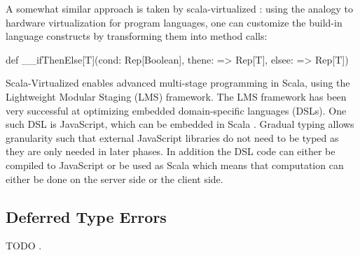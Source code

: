 A somewhat similar approach is taken by scala-virtualized \cite{scala-virtualized}: using the analogy to hardware virtualization for program languages, one can customize the build-in language constructs by transforming them into method calls:

\begin{lstlisting-nobreak}
def __ifThenElse[T](cond: Rep[Boolean], thene: => Rep[T], elsee: => Rep[T])
\end{lstlisting-nobreak}

Scala-Virtualized enables advanced multi-stage programming in Scala, using the Lightweight Modular Staging (LMS) framework. The LMS framework has been very successful at optimizing embedded domain-specific languages (DSLs). One such DSL is JavaScript, which can be embedded in Scala \cite{greg-js-dsl}. Gradual typing allows granularity such that external JavaScript libraries do not need to be typed as they are only needed in later phases. In addition the DSL code can either be compiled to JavaScript or be used as Scala which means  that computation can either be done on the server side or the client side.

\subsection{Deferred Type Errors}

TODO \cite{haskell-deferred-type-errors}.


\newcommand{\DS}{\begin{sideways}DuctileScala\end{sideways}}
\newcommand{\hask}{\begin{sideways}Haskell\end{sideways}}
\newcommand{\dyn}{\begin{sideways}Dynamic / Scala-JS\;\end{sideways}}
\newcommand{\SV}{\begin{sideways}Scala-Virtualized\end{sideways}}
\newcommand{\dart}{\begin{sideways}Dart\end{sideways}}
\newcommand{\DL}{\begin{sideways}dynamic languages\end{sideways}}
\newcommand{\JSLMS}{\begin{sideways}JS on LMS\end{sideways}}
\newcommand{\SD}{\begin{sideways}ScalaDyno\end{sideways}}

